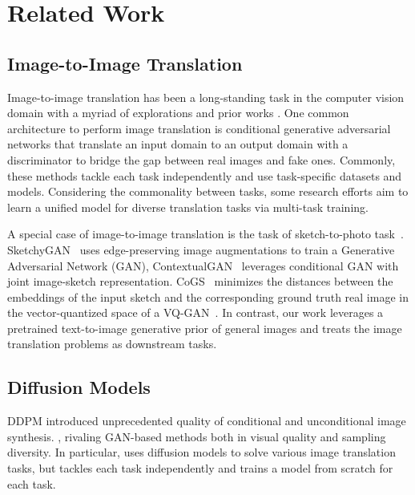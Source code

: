 \section{Related Work}
\label{sec:prior}

\subsection{Image-to-Image Translation} Image-to-image translation has been a long-standing task in the computer vision domain with a myriad of explorations and prior works \cite{pang2021image}. One common architecture to perform image translation is conditional generative adversarial networks \cite{isola2017image, zhu2017toward,wang2018high,park2019semantic,zhu2017unpaired} that translate an input domain to an output domain with a discriminator to bridge the gap between real images and fake ones. Commonly, these methods tackle each task independently and use task-specific datasets and models. Considering the commonality between tasks, some research efforts \cite{zhang2021ufc,huang2022multimodal,kutuzova2021multimodal} aim to learn a unified model for diverse translation tasks via multi-task training. 

A special case of image-to-image translation is the task of sketch-to-photo task~\cite{xiang2022adversarial,ghosh2019interactive,gao2020sketchycoco}. SketchyGAN~\cite{chen2018sketchygan} uses edge-preserving image augmentations to train a Generative Adversarial Network (GAN), ContextualGAN~\cite{lu2018image} leverages conditional GAN with joint image-sketch representation. CoGS~\cite{ham2022cogs} minimizes the distances between the embeddings of the input sketch and the corresponding ground truth real image in the vector-quantized space of a VQ-GAN~\cite{esser2021taming}. In contrast, our work leverages a pretrained text-to-image generative prior of general images and treats the image translation problems as downstream tasks. 

\subsection{Diffusion Models} DDPM introduced unprecedented quality of conditional and unconditional image synthesis. \cite{ho2020denoising,dhariwal2021diffusion,ho2022cascaded}, rivaling GAN-based methods both in visual quality and sampling diversity. In particular, \cite{saharia2022palette} uses diffusion models to solve various image translation tasks, but tackles each task independently and trains a model from scratch for each task. 

